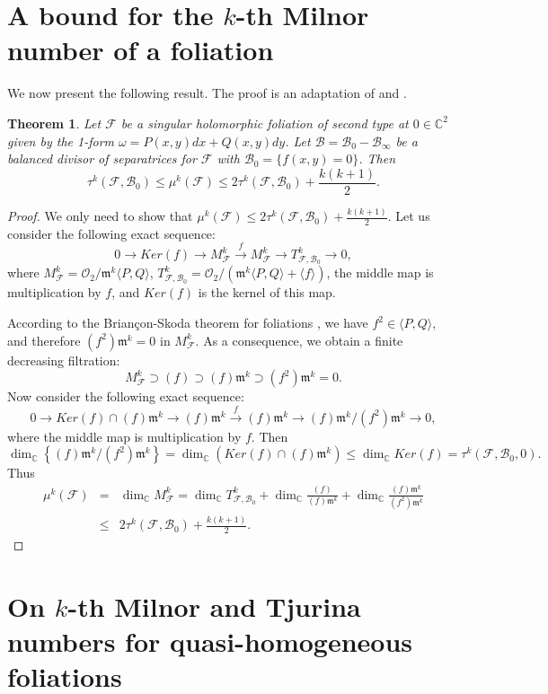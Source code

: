 \documentclass[12pt,letterpaper]{amsart}
\newcommand{\C}{\mathbb{C}}
\newcommand{\F}{\mathcal{F}}
\newcommand{\m}{\mathfrak{m}}
\newtheorem{theorem}{Theorem}[section]
\newcommand{\B}{\mathcal{B}}
\begin{document}
\section{A bound for the $k$-th Milnor number of a foliation}\label{bound_section}
We now present the following result. The proof is an adaptation of \cite[Theorem 1.1]{Liu} and \cite[Theorem 1.3]{Hussain_1}.
\begin{theorem}
    Let $\F$ be a singular holomorphic foliation of second type at $0\in\C^2$ given by the 1-form $\omega=P(x,y)dx+Q(x,y)dy$. Let $\B=\B_0-\B_{\infty}$ be a balanced divisor of separatrices for $\F$ with $\B_0=\{f(x,y)=0\}$. Then
    \[\tau^{k}(\F,\B_0)\leq \mu^{k}(\F)\leq 2\tau^{k}(\F,\B_0)+\frac{k(k+1)}{2}.\]
\end{theorem}
\begin{proof}
We only need to show that $\mu^{k}(\F)\leq 2\tau^{k}(\F,\B_0)+\frac{k(k+1)}{2}$. Let us consider the following exact sequence:
\[0\to Ker(f)\to M^{k}_{\F}\xrightarrow{f} M^{k}_{\F}\to T^{k}_{\F,\B_0}\to 0,\]
where $M^{k}_{\F}=\mathcal{O}_2/\m^{k}\langle P,Q\rangle$, $T^{k}_{\F,\B_0}=\mathcal{O}_2/(\m^{k}\langle P,Q\rangle+\langle f\rangle)$, the middle map is multiplication by $f$, and $Ker(f)$ is the kernel of this map.
\par  According to the Brian\c{c}on-Skoda theorem for foliations \cite{Skoda}, we have $f^2\in\langle P,Q\rangle$, and therefore $(f^2)\m^k=0$ in $M^{k}_{\F}$. As a consequence, we obtain a finite decreasing filtration:
\[M^{k}_{\F}\supset (f)\supset (f)\m^k\supset (f^2)\m^k=0.\]
Now consider the following exact sequence:
\[0\to Ker(f)\cap (f)\m^k\to (f)\m^k\xrightarrow{f} (f)\m^k\to (f)\m^k/(f^2)\m^k\to 0,\]
where the middle map is multiplication by $f$. Then
\[\dim_\C\left\{(f)\m^k/(f^2)\m^k \right\}=\dim_{\C}(Ker(f)\cap (f)\m^k)\leq \dim_\C Ker(f)=\tau^{k}(\F,\B_0,0).\] Thus
\begin{eqnarray*}
    \mu^{k}(\F)&=&\dim_\C M^{k}_{\F}=\dim_\C T^k_{\F,\B_0}+\dim_\C \frac{(f)}{(f)\m^k}+\dim_{\C}\frac{(f)\m^k}{(f^2)\m^k}\\
    &\leq& 2\tau^{k}(\F,\B_0)+\frac{k(k+1)}{2}.
\end{eqnarray*}
\end{proof}

\section{On $k$-th Milnor and Tjurina numbers for quasi-homogeneous foliations}\label{section_quasi}
\end{document}
